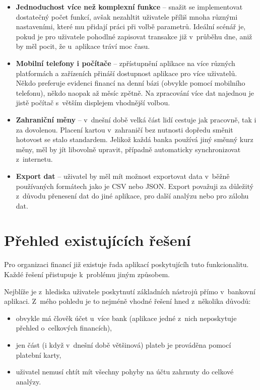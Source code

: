 \documentclass[
  biblatex,
  figures=true,
  tables=false,
  glossaries,
  index
]{kidiplom}
\begin{document}
\begin{itemize}
  \item \textbf{Jednoduchost více než komplexní funkce} -- snažit se implementovat dostatečný počet funkcí, avšak nezahltit uživatele příliš mnoha různými nastaveními, které mu přidají práci při volbě parametrů. Ideální scénář je, pokud je pro uživatele pohodlné zapisovat transakce již v~průběhu dne, aniž by měl pocit, že u~aplikace tráví moc času.
  \item \textbf{Mobilní telefony i počítače} -- zpřístupnění aplikace na více různých platformách a zařízeních přináší dostupnost aplikace pro více uživatelů. Někdo preferuje evidenci financí na denní bázi (obvykle pomocí mobilního telefonu), někdo naopak až měsíc zpětně. Na zpracování více dat najednou je jistě počítač s~větším displejem vhodnější volbou.
  \item \textbf{Zahraniční měny} -- v~dnešní době velká část lidí cestuje jak pracovně, tak i za dovolenou. Placení kartou v~zahraničí bez nutnosti dopředu směnit hotovost se stalo standardem. Jelikož každá banka používá jiný směnný kurz měny, měl by jít libovolně upravit, případně automaticky synchronizovat z~internetu.
  \item \textbf{Export dat} -- uživatel by měl mít možnost exportovat data v~běžně používaných formátech jako je CSV nebo JSON. Export považuji za důležitý z~důvodu přenesení dat do jiné aplikace, pro další analýzu nebo pro zálohu dat.
\end{itemize}

\section{Přehled existujících řešení}
Pro organizaci financí již existuje řada aplikací poskytujícíh tuto funkcionalitu. Každé řešení přistupuje k~problému jiným způsobem. 

Nejblíže je z~hlediska uživatele poskytnutí základních nástrojů přímo v~bankovní aplikaci. Z~mého pohledu je to nejméně vhodné řešení hned z~několika důvodů:
\begin{itemize}
  \item obvykle má člověk účet u~více bank (aplikace jedné z~nich neposkytuje přehled o~celkových financích),
  \item jen část (i když v~dnešní době většinová) plateb je prováděna pomocí platební karty,
  \item uživatel nemusí chtít mít všechny pohyby na účtu zahrnuty do celkové analýzy.
\end{itemize}
\end{document}
